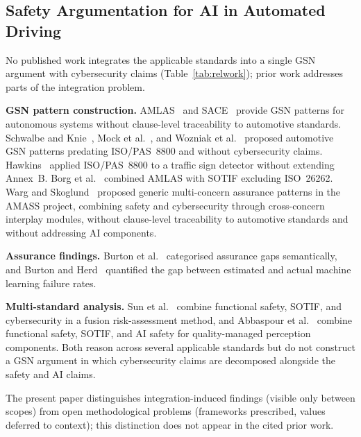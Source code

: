 \documentclass[runningheads]{llncs}
\newcommand{\crev}[1]{\textcolor{blue!75!black}{#1}}
\newcommand{\crev}[1]{#1}
\begin{document}
	\subsection{Safety Argumentation for AI in Automated Driving}
	\label{sec:relwork}
	
	No published work integrates the applicable standards into a single GSN argument with cybersecurity claims (Table~\ref{tab:relwork}); prior work addresses parts of the integration problem.
	
	\textbf{GSN pattern construction.} AMLAS~\cite{Hawkins2021} and SACE~\cite{Hawkins2022} provide GSN patterns for autonomous systems without clause-level traceability to automotive standards. Schwalbe and Knie~\cite{Schwalbe2020}, Mock et al.~\cite{Mock2021}, and Wozniak et al.~\cite{Wozniak2020} proposed automotive GSN patterns predating ISO/PAS~8800 and without cybersecurity claims. Hawkins~\cite{Hawkins2025BSI} applied ISO/PAS~8800 to a traffic sign detector without extending Annex~B. Borg et al.~\cite{Borg2023} combined AMLAS with SOTIF excluding ISO~26262. \crev{Warg and Skoglund~\cite{Warg2019} proposed generic multi-concern assurance patterns in the AMASS project, combining safety and cybersecurity through cross-concern interplay modules, without clause-level traceability to automotive standards and without addressing AI components.}
	
	\textbf{Assurance findings.} Burton et al.~\cite{Burton2020} categorised assurance gaps semantically, and Burton and Herd~\cite{Burton2023} quantified the gap between estimated and actual machine learning failure rates.
	
	\crev{\textbf{Multi-standard analysis.} Sun et al.~\cite{Sun2025} combine functional safety, SOTIF, and cybersecurity in a fusion risk-assessment method, and Abbaspour et al.~\cite{Abbaspour2026} combine functional safety, SOTIF, and AI safety for quality-managed perception components. Both reason across several applicable standards but do not construct a GSN argument in which cybersecurity claims are decomposed alongside the safety and AI claims.}
	
	The present paper distinguishes integration-induced findings (visible only between scopes) from open methodological problems (frameworks prescribed, values deferred to context); this distinction does not appear in the cited prior work.
	
\end{document}
